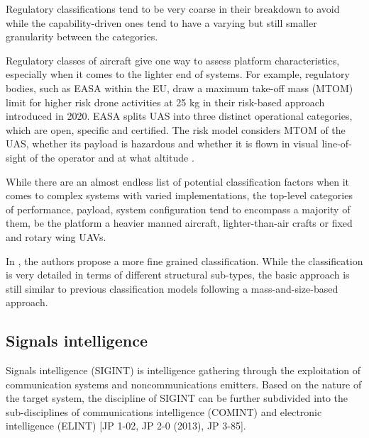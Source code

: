 \documentclass[english, 12pt, a4paper, elec, utf8, a-1b, online]{aaltothesis}
\begin{document}
Regulatory classifications tend to be very coarse in their breakdown to avoid %
while the capability-driven ones tend to have a varying but still smaller granularity between the categories.

Regulatory classes of aircraft give one way to assess platform characteristics, especially when it comes to the lighter end of systems.
For example, regulatory bodies, such as EASA within the EU, draw a maximum take-off mass (MTOM) limit for higher risk drone activities at 25 kg in their risk-based approach introduced in 2020.
EASA splits UAS into three distinct operational categories, which are open, specific and certified. The risk model considers MTOM of the UAS, whether its payload is hazardous and whether it is flown in visual line-of-sight of the operator and at what altitude \cite{alamouri2021exploratory}. 

While there are an almost endless list of potential classification factors when it comes to complex systems with varied implementations, the top-level categories of performance, payload, system configuration tend to encompass a majority of them, be the platform a heavier manned aircraft, lighter-than-air crafts or fixed and rotary wing UAVs.


In \cite{hassanalian2017classifications}, the authors propose a more fine grained classification. While the classification is very detailed in terms of different structural sub-types, the basic approach is still similar to previous classification models following a mass-and-size-based approach.



\subsection{Signals intelligence}
Signals intelligence (SIGINT) is intelligence gathering through the exploitation of communication systems and noncommunications emitters.
Based on the nature of the target system, the discipline of SIGINT can be further subdivided into the sub-disciplines of communications intelligence (COMINT) and electronic intelligence (ELINT) \cite{national2015bulk} [JP 1-02, JP 2-0 (2013), JP 3-85].
\end{document}
